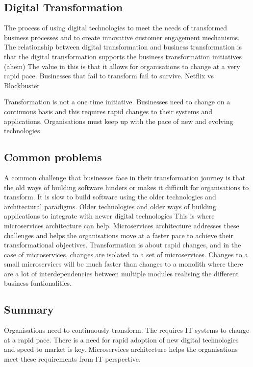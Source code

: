 \documentclass[a4paper, 11pt]{book}
\begin{document}
    \subsection{Digital Transformation}
    The process of using digital technologies to meet the needs of transformed business processes and to create innovative customer engagement mechanisms.
    The relationship between digital transformation and business transformation is that the digital transformation supports the business transformation initiatives (ahem)
    The value in this is that it allows for organisations to change at a very rapid pace.
    Businesses that fail to transform fail to survive.
    Netflix vs Blockbuster

    Transformation is not a one time initiative.
    Businesses need to change on a continuous basis and this requires rapid changes to their systems and applications.
    Organisations must keep up with the pace of new and evolving technologies.

    \subsection{Common problems}
    A common challenge that businesses face in their transformation journey is that the old ways of building software hinders or makes it difficult for organisations to transform.
    It is slow to build software using the older technologies and architectural paradigms.
    Older technologies and older ways of building applications to integrate with newer digital technologies
    This is where microservices architecture can help.
    Microservices architecture addresses these challenges and helps the organisations move at a faster pace to achieve their transformational objectives.
    Transformation is about rapid changes, and in the case of microservices, changes are isolated to a set of microservices.
    Changes to a small microservices will be much faster than changes to a monolith where there are a lot of interdependencies between multiple modules realising the different business funtionalities.

    \subsection{Summary}
    Organisations need to continuously transform.
    The requires IT systems to change at a rapid pace.
    There is a need for rapid adoption of new digital technologies and speed to market is key.
    Microservices architecture helps the organisations meet these requirements from IT perspective.
\end{document}
